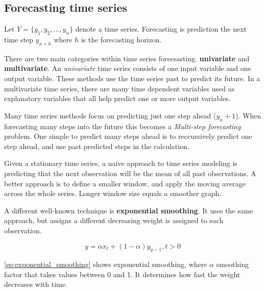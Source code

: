 \subsection{Forecasting time series}
Let  $Y = \{y_1, y_2, ..., y_n\}$ denote a time series.
Forecasting is prediction the next time step $y_{n+h}$ where $h$ is the forecasting horizon.

There are two main categories within time series forecsasting. \textbf{univariate} and \textbf{multivariate}. 
An \textit{univariate} time series consists of one input variable and one output variable. These methods use the time series past to predict its future.
In a multivariate time series, there are many time dependent variables used as explanatory variables that all help predict one or more output variables.


Many time series methods focus on predicting just one step ahead ($y_n+1$). When forecasting many steps into the future this becomes a 
\textit{Multi-step forecasting} problem. One simple to predict many steps ahead is to reccursively predict one step ahead, and use past predicted steps 
in the calculation.


Given a stationary time series, a naive approach to time series modeling is predicting that the next observation will be the
mean of all past observations. A better approach is to define a smaller window, and
apply the moving average across the whole series. Longer window size equals a smoother graph.

A different well-known technique is \textbf{exponential smoothing}. It uses the same approach,
but assigns a different decreasing weight is assigned to each observation.

\begin{equation}
    \label{eq:exponential_smoothing}
    y = \alpha x_t + (1 - \alpha)y_{y-1}, t > 0
\end{equation}

\autoref{eq:exponential_smoothing}
shows exponential smoothing, where $\alpha$ smoothing factor
that takes values between 0 and 1. It determines how fast the weight decreases with time.





